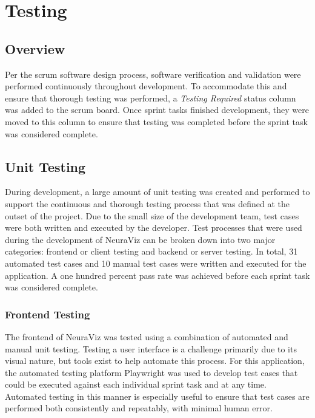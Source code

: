 \section{Testing}
\label{sec:Testing}

\subsection{Overview} 
Per the scrum software design process, software verification and validation were performed continuously throughout development. To accommodate this and ensure that thorough testing was performed, a \textit{Testing Required} status column was added to the scrum board. Once sprint tasks finished development, they were moved to this column to ensure that testing was completed before the sprint task was considered complete.

\subsection{Unit Testing}
During development, a large amount of unit testing was created and performed to support the continuous and thorough testing process that was defined at the outset of the project. Due to the small size of the development team, test cases were both written and executed by the developer. Test processes that were used during the development of NeuraViz can be broken down into two major categories: frontend or client testing and backend or server testing. In total, 31 automated test cases and 10 manual test cases were written and executed for the application. A one hundred percent pass rate was achieved before each sprint task was considered complete.

\subsubsection{Frontend Testing}
The frontend of NeuraViz was tested using a combination of automated and manual unit testing. Testing a user interface is a challenge primarily due to its visual nature, but tools exist to help automate this process. For this application, the automated testing platform Playwright \cite{playwright} was used to develop test cases that could be executed against each individual sprint task and at any time. Automated testing in this manner is especially useful to ensure that test cases are performed both consistently and repeatably, with minimal human error. 

